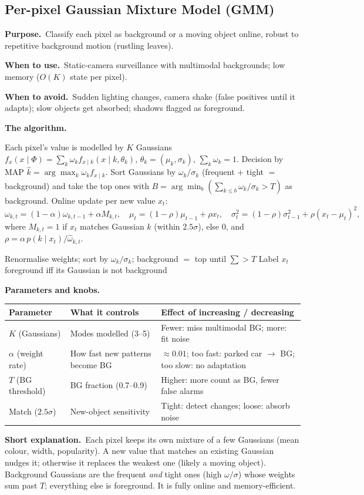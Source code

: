 \documentclass[10pt]{article}
\makeatletter
\newcommand{\Purpose}{\par\smallskip\textbf{Purpose.}\ }
\newcommand{\WhenUse}{\par\textbf{When to use.}\ }
\newcommand{\WhenAvoid}{\par\textbf{When to avoid.}\ }
\newcommand{\TheAlgo}{\par\smallskip\textbf{The algorithm.}\par\nopagebreak}
\newcommand{\Knobs}{\par\smallskip\textbf{Parameters and knobs.}\par\nopagebreak}
\newcommand{\ShortExp}{\par\smallskip\textbf{Short explanation.}\ }
\newenvironment{ptable}{\begin{center}\small\begin{tabular}{@{}p{2.5cm} p{5.9cm} p{6.2cm}@{}}\toprule
Parameter & What it controls & Effect of increasing / decreasing \\ \midrule}
{\bottomrule\end{tabular}\end{center}}
\makeatother
\begin{document}
\subsection{Per-pixel Gaussian Mixture Model (GMM)}
\Purpose Classify each pixel as background or a moving object online, robust to repetitive background
motion (rustling leaves).
\WhenUse Static-camera surveillance with multimodal backgrounds; low memory ($O(K)$ state per pixel).
\WhenAvoid Sudden lighting changes, camera shake (false positives until it adapts); slow objects get
absorbed; shadows flagged as foreground.
\TheAlgo Each pixel's value is modelled by $K$ Gaussians
$f_x(x\mid\Phi)=\sum_k\omega_k f_{x\mid k}(x\mid k,\theta_k)$, $\theta_k=(\mu_k,\sigma_k)$,
$\sum_k\omega_k=1$. Decision by MAP $\hat k=\arg\max_k\omega_k f_{x\mid k}$. Sort Gaussians by
$\omega_k/\sigma_k$ (frequent $+$ tight $=$ background) and take the top ones with
$B=\arg\min_b(\sum_{k\le b}\omega_k/\sigma_k>T)$ as background. Online update per new value $x_t$:
\[
\omega_{k,t}=(1-\alpha)\omega_{k,t-1}+\alpha M_{k,t},\quad
\mu_t=(1-\rho)\mu_{t-1}+\rho x_t,\quad
\sigma_t^2=(1-\rho)\sigma_{t-1}^2+\rho(x_t-\mu_t)^2,
\]
where $M_{k,t}=1$ if $x_t$ matches Gaussian $k$ (within $2.5\sigma$), else $0$, and
$\rho=\alpha\,p(k\mid x_t)/\hat\omega_{k,t}$.

\begin{algorithm}[H]
\SetAlgoLined
{}
Renormalise weights; sort by $\omega_k/\sigma_k$; background $=$ top until $\sum>T$\;
Label $x_t$ foreground iff its Gaussian is not background\;
\caption{Online GMM background subtraction}
\end{algorithm}

\Knobs
\begin{ptable}
$K$ (Gaussians) & Modes modelled (3--5) & Fewer: miss multimodal BG; more: fit noise \\
$\alpha$ (weight rate) & How fast new patterns become BG & $\approx0.01$; too fast: parked car $\to$ BG; too slow: no adaptation \\
$T$ (BG threshold) & BG fraction (0.7--0.9) & Higher: more count as BG, fewer false alarms \\
Match ($2.5\sigma$) & New-object sensitivity & Tight: detect changes; loose: absorb noise \\
\end{ptable}
\ShortExp Each pixel keeps its own mixture of a few Gaussians (mean colour, width, popularity). A new value
that matches an existing Gaussian nudges it; otherwise it replaces the weakest one (likely a moving object).
Background Gaussians are the frequent \emph{and} tight ones (high $\omega/\sigma$) whose weights sum past
$T$; everything else is foreground. It is fully online and memory-efficient.
\end{document}
